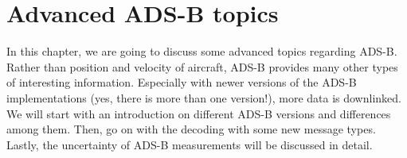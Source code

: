 \chapter{Advanced ADS-B topics} \label{advanced-topics}

In this chapter, we are going to discuss some advanced topics regarding
ADS-B. Rather than position and velocity of aircraft, ADS-B provides
many other types of interesting information. Especially with newer
versions of the ADS-B implementations (yes, there is more than one
version!), more data is downlinked. We will start with an introduction
on different ADS-B versions and differences among them. Then, go on with
the decoding with some new message types. Lastly, the uncertainty of
ADS-B measurements will be discussed in detail.
